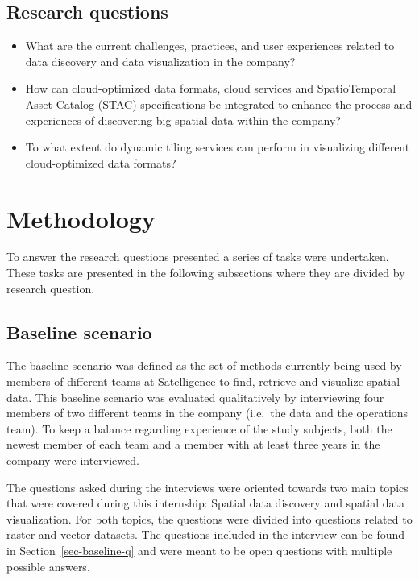 \documentclass[
  oneside,
  open=any]{scrbook}
\providecommand{\tightlist}{%
  \setlength{\itemsep}{0pt}\setlength{\parskip}{0pt}}\usepackage{longtable,booktabs,array}
\begin{document}
\section{Research questions}\label{research-questions}

\begin{itemize}
\tightlist
\item
  What are the current challenges, practices, and user experiences
  related to data discovery and data visualization in the company?
\item
  How can cloud-optimized data formats, cloud services and
  SpatioTemporal Asset Catalog (STAC) specifications be integrated to
  enhance the process and experiences of discovering big spatial data
  within the company?
\item
  To what extent do dynamic tiling services can perform in visualizing
  different cloud-optimized data formats?
\end{itemize}

\chapter{Methodology}\label{methodology}

To answer the research questions presented a series of tasks were
undertaken. These tasks are presented in the following subsections where
they are divided by research question.

\section{Baseline scenario}\label{baseline-scenario}

The baseline scenario was defined as the set of methods currently being
used by members of different teams at Satelligence to find, retrieve and
visualize spatial data. This baseline scenario was evaluated
qualitatively by interviewing four members of two different teams in the
company (i.e.~the data and the operations team). To keep a balance
regarding experience of the study subjects, both the newest member of
each team and a member with at least three years in the company were
interviewed.

The questions asked during the interviews were oriented towards two main
topics that were covered during this internship: Spatial data discovery
and spatial data visualization. For both topics, the questions were
divided into questions related to raster and vector datasets. The
questions included in the interview can be found in
Section~\ref{sec-baseline-q} and were meant to be open questions with
multiple possible answers.
\end{document}
